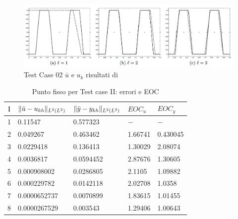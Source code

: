 \begin{figure}
\centering
\includegraphics[width=\linewidth]{img/cap6/TestCase02_ues_paper}
\caption{Test Case 02 $\overline{u}$ e $u_k$ risultati di \cite{MAIN}}
\label{fig:503}
\end{figure}

\begin{table}
\caption{Punto fisso per Test case II: errori e EOC }
\label{puntofissoII}
\centering

\begin{tabular}{cllll}
\toprule
{l}           &  {$ \lVert\bar{u}-u_{kh}\rVert_{L^2(L^2)} $} &  {$ \lVert\bar{y}-y_{kh}\rVert_{L^2(L^2)} $} &  {$ EOC_{u} $} &  {$ EOC_y $} \\
\midrule
1            &  0.11547 &  0.577323 &  {$-$} &  {$-$} \\
2            &  0.049267 &  0.463462 &  1.66741 &  0.430045 \\
3            &  0.0229418 &  0.136413 &  1.30029 &  2.08074 \\
4            &  0.0036817 &  0.0594452 &  2.87676 &  1.30605 \\
5            &  0.000908002 &  0.0286805 &  2.1105 &  1.09882 \\
6            &  0.000229782  &  0.0142118 &  2.02708 &  1.0358 \\
7            &  0.0000652737 &  0.0070899 &  1.83615 &  1.01455 \\      
8            &  0.0000267529 &  0.003543 &  1.29406 &  1.00643 \\
\bottomrule
\end{tabular}              

\end{table}


